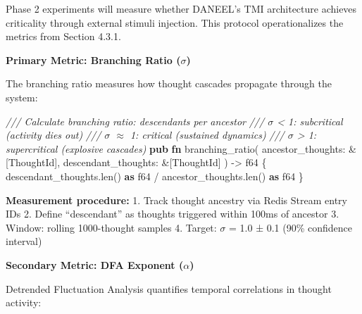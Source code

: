 \documentclass[
]{article}
\newenvironment{Shaded}{}{}
\newcommand{\CommentTok}[1]{\textcolor[rgb]{0.38,0.63,0.69}{\textit{#1}}}
\newcommand{\DataTypeTok}[1]{\textcolor[rgb]{0.56,0.13,0.00}{#1}}
\newcommand{\KeywordTok}[1]{\textcolor[rgb]{0.00,0.44,0.13}{\textbf{#1}}}
\newcommand{\NormalTok}[1]{#1}
\newcommand{\OperatorTok}[1]{\textcolor[rgb]{0.40,0.40,0.40}{#1}}
\begin{document}
Phase 2 experiments will measure whether DANEEL's TMI architecture
achieves criticality through external stimuli injection. This protocol
operationalizes the metrics from Section 4.3.1.

\textbf{Primary Metric: Branching Ratio ($\sigma$)}

The branching ratio measures how thought cascades propagate through the
system:

\begin{Shaded}
\begin{Highlighting}[]
\CommentTok{/// Calculate branching ratio: descendants per ancestor}
\CommentTok{/// $\sigma$ \textless{} 1: subcritical (activity dies out)}
\CommentTok{/// $\sigma$ $\approx$ 1: critical (sustained dynamics)}
\CommentTok{/// $\sigma$ \textgreater{} 1: supercritical (explosive cascades)}
\KeywordTok{pub} \KeywordTok{fn}\NormalTok{ branching\_ratio(}
\NormalTok{    ancestor\_thoughts}\OperatorTok{:} \OperatorTok{\&}\NormalTok{[ThoughtId]}\OperatorTok{,}
\NormalTok{    descendant\_thoughts}\OperatorTok{:} \OperatorTok{\&}\NormalTok{[ThoughtId]}
\NormalTok{) }\OperatorTok{{-}\textgreater{}} \DataTypeTok{f64} \OperatorTok{\{}
\NormalTok{    descendant\_thoughts}\OperatorTok{.}\NormalTok{len() }\KeywordTok{as} \DataTypeTok{f64} \OperatorTok{/}\NormalTok{ ancestor\_thoughts}\OperatorTok{.}\NormalTok{len() }\KeywordTok{as} \DataTypeTok{f64}
\OperatorTok{\}}
\end{Highlighting}
\end{Shaded}

\textbf{Measurement procedure:} 1. Track thought ancestry via Redis
Stream entry IDs 2. Define ``descendant'' as thoughts triggered within
100ms of ancestor 3. Window: rolling 1000-thought samples 4. Target: $\sigma$ =
1.0 ± 0.1 (90\% confidence interval)

\textbf{Secondary Metric: DFA Exponent ($\alpha$)}

Detrended Fluctuation Analysis quantifies temporal correlations in
thought activity:
\end{document}
